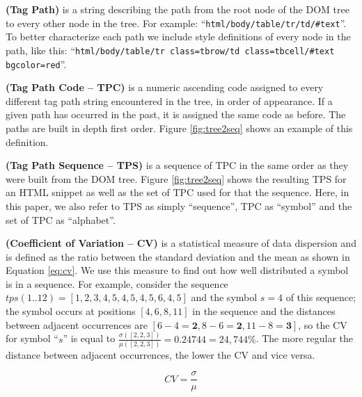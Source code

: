 \documentclass{vldb}
\begin{document}
\begin{definition}\textbf{(Tag Path)} is a string describing the path from the
root node of the DOM tree to every other node in the tree. For example:
``\texttt{html/body/table/tr/td/\#text}''. To better characterize each path we
include style definitions of every node in the path, like this:
``\texttt{html/body/table/tr class=tbrow/td class=tbcell/\#text bgcolor=red}''.
\end{definition}

\begin{definition}\textbf{(Tag Path Code -- TPC)} is a numeric ascending code
assigned to every different tag path string encountered in the tree, in order of
appearance. If a given path has occurred in the past, it is assigned the same
code as before. The paths are built in depth first order. Figure
\ref{fig:tree2seq} shows an example of this definition.
\end{definition}

\begin{definition}\textbf{(Tag Path Sequence -- TPS)} is a sequence of TPC in
the same order as they were built from the DOM tree. Figure \ref{fig:tree2seq} shows
the resulting TPS for an HTML snippet as  well as the set of TPC used for that
the sequence. Here, in this paper, we also refer to TPS as simply ``sequence'',
TPC as ``symbol'' and the set of TPC as ``alphabet''.
\end{definition}

\begin{definition}\textbf{(Coefficient of Variation -- CV)}\label{def:cv} is a
statistical measure of data dispersion and is defined as the ratio between the standard
deviation and the mean as shown in Equation \ref{eq:cv}. We use this measure to
find out how well distributed a symbol is in a sequence. For example, consider
the sequence $tps(1..12)=[1,2,3,4,5,4,5,4,5,6,4,5]$ and the symbol $s=4$ of this
sequence; the symbol occurs at positions $[4,6,8,11]$ in the sequence and the
distances between adjacent occurrences are
$[6-4=\textbf{2},8-6=\textbf{2},11-8=\textbf{3}]$, so the CV for symbol ``$s$''
is equal to $\frac{\sigma([2, 2, 3])}{\mu([2, 2, 3])}=0.24744=24,744\%$. The more
regular the distance between adjacent occurrences, the lower the CV and vice
versa.

\begin{equation}\label{eq:cv}
    CV=\frac{\sigma}{\mu}
\end{equation}
\end{definition}
\end{document}
